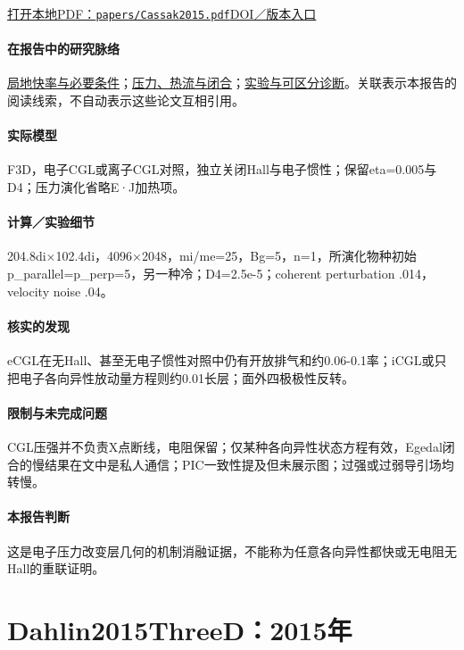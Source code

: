 \documentclass[UTF8,a4paper,11pt,openany,fontset=fandol]{ctexbook}
\begin{document}
\href{run:../papers/Cassak2015.pdf}{打开本地PDF：\texttt{papers/Cassak2015.pdf}}\quad\href{https://doi.org/10.1063/1.4908545}{DOI／版本入口}

\paragraph{在报告中的研究脉络}\hyperref[story:fast]{局地快率与必要条件}；\hyperref[story:closure]{压力、热流与闭合}；\hyperref[story:diagnostic]{实验与可区分诊断}。关联表示本报告的阅读线索，不自动表示这些论文互相引用。

\paragraph{实际模型}F3D，电子CGL或离子CGL对照，独立关闭Hall与电子惯性；保留eta=0.005与D4；压力演化省略E·J加热项。

\paragraph{计算／实验细节}204.8di×102.4di，4096×2048，mi/me=25，Bg=5，n=1，所演化物种初始p\_parallel=p\_perp=5，另一种冷；D4=2.5e-5；coherent perturbation .014，velocity noise .04。

\paragraph{核实的发现}eCGL在无Hall、甚至无电子惯性对照中仍有开放排气和约0.06-0.1率；iCGL或只把电子各向异性放动量方程则约0.01长层；面外四极极性反转。

\paragraph{限制与未完成问题}CGL压强并不负责X点断线，电阻保留；仅某种各向异性状态方程有效，Egedal闭合的慢结果在文中是私人通信；PIC一致性提及但未展示图；过强或过弱导引场均转慢。

\paragraph{本报告判断}这是电子压力改变层几何的机制消融证据，不能称为任意各向异性都快或无电阻无Hall的重联证明。

\section{Dahlin2015ThreeD：2015年}\label{paper:Dahlin2015ThreeD}
\end{document}
